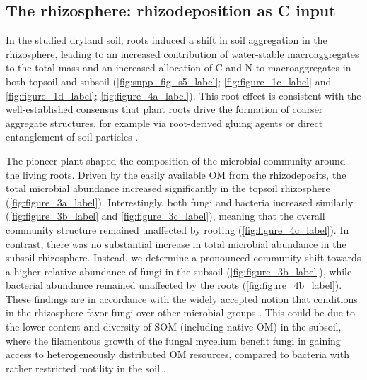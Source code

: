 \subsection{The rhizosphere: rhizodeposition as C input}

In the studied dryland soil, roots induced a shift in soil aggregation in the rhizosphere, leading to an increased contribution of water-stable macroaggregates to the total mass and an increased allocation of C and N to macroaggregates in both topsoil and subsoil (\cref{fig:supp_fig_s5_label}; \cref{fig:figure_1c_label} and \cref{fig:figure_1d_label}; \cref{fig:figure_4a_label}). This root effect is consistent with the well-established consensus that plant roots drive the formation of coarser aggregate structures, for example via root-derived gluing agents or direct entanglement of soil particles \citep{Tisdall1982, Six2004, Angst2018, Gregory2022}.

The pioneer plant shaped the composition of the microbial community around the living roots. Driven by the easily available OM from the rhizodeposits, the total microbial abundance increased significantly in the topsoil rhizosphere (\cref{fig:figure_3a_label}). Interestingly, both fungi and bacteria increased similarly (\cref{fig:figure_3b_label} and \cref{fig:figure_3c_label}), meaning that the overall community structure remained unaffected by rooting (\cref{fig:figure_4c_label}). In contrast, there was no substantial increase in total microbial abundance in the subsoil rhizosphere. Instead, we determine a pronounced community shift towards a higher relative abundance of fungi in the subsoil (\cref{fig:figure_3b_label}), while bacterial abundance remained unaffected by the roots (\cref{fig:figure_4b_label}). These findings are in accordance with the widely accepted notion that conditions in the rhizosphere favor fungi over other microbial groups \citep{Butler2003, Brant2006, Denef2009}. This could be due to the lower content and diversity of SOM (including native OM) in the subsoil, where the filamentous growth of the fungal mycelium benefit fungi in gaining access to heterogeneously distributed OM resources, compared to bacteria with rather restricted motility in the soil \citep{DeBoer2005}.

